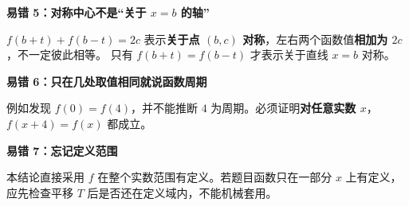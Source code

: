 \clearpage
\begin{trapbox}
\textbf{\textcolor{CTrap}{易错 5：对称中心不是“关于 $x=b$ 的轴”}}



$ f(b+t)+f(b-t)=2c $ 表示\textbf{关于点 $(b,c)$ 对称}，左右两个函数值\textbf{相加为 $2c$}，不一定彼此相等。
只有 $f(b+t)=f(b-t)$ 才表示关于直线 $x=b$ 对称。

\medskip

\end{trapbox}
\clearpage
\begin{trapbox}
\textbf{\textcolor{CTrap}{易错 6：只在几处取值相同就说函数周期}}



例如发现 $f(0)=f(4)$，并不能推断 $4$ 为周期。必须证明\textbf{对任意实数 $x$}，$f(x+4)=f(x)$ 都成立。

\medskip

\end{trapbox}
\clearpage
\begin{trapbox}
\textbf{\textcolor{CTrap}{易错 7：忘记定义范围}}



本结论直接采用 $f$ 在整个实数范围有定义。若题目函数只在一部分 $x$ 上有定义，应先检查平移 $T$ 后是否还在定义域内，不能机械套用。
\end{trapbox}
